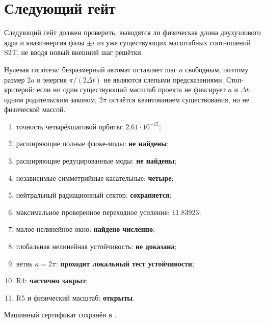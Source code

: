 \section{Следующий гейт}

Следующий гейт
должен проверить, выводятся ли физическая длина двухузлового ядра и
квазиэнергия фазы $\pm i$ из уже существующих масштабных соотношений S2T,
не вводя новый внешний шаг решётки.

Нулевая гипотеза: безразмерный автомат оставляет шаг $a$ свободным, поэтому
размер $2a$ и энергия $\pi/(2\Delta t)$ не являются слепыми
предсказаниями. Стоп-критерий: если ни один существующий масштаб проекта
не фиксирует $a$ и $\Delta t$ одним родительским законом, $2\pi$ остаётся
квантованием существования, но не физической массой.

\begin{protocol}
\begin{enumerate}
 \item точность четырёхшаговой орбиты: \textbf{$2.61\cdot10^{-15}$};
 \item расширяющие полные флоке-моды: \textbf{не найдены};
 \item расширяющие редуцированные моды: \textbf{не найдены};
 \item независимые симметрийные касательные: \textbf{четыре};
 \item нейтральный радиационный сектор: \textbf{сохраняется};
 \item максимальное проверенное переходное усиление:
       \textbf{$11.83923$};
 \item малое нелинейное окно: \textbf{найдено численно};
 \item глобальная нелинейная устойчивость: \textbf{не доказана};
 \item ветвь $\kappa=2\pi$: \textbf{проходит локальный тест устойчивости};
 \item R4: \textbf{частично закрыт};
 \item R5 и физический масштаб: \textbf{открыты}.
\end{enumerate}
\end{protocol}

Машинный сертификат сохранён в
.